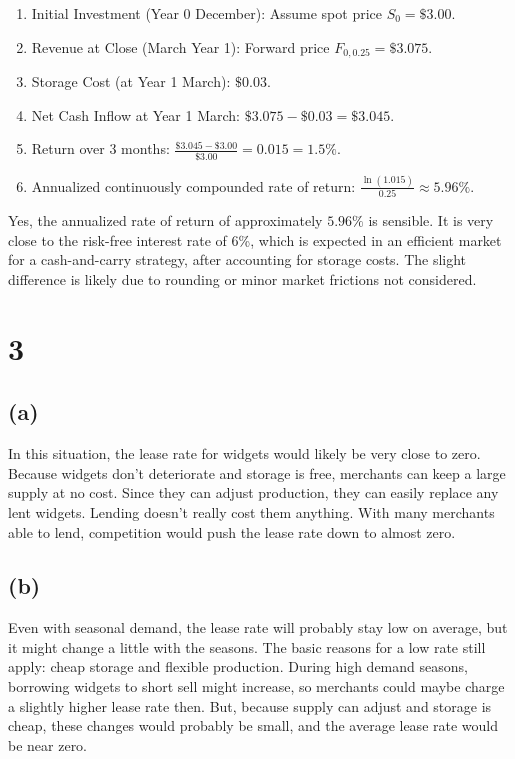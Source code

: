 \begin{enumerate}
\def\labelenumi{\arabic{enumi}.}
\tightlist
\item
  Initial Investment (Year 0 December): Assume spot price
  \(S_0 = \$3.00\).
\item
  Revenue at Close (March Year 1): Forward price
  \(F_{0,0.25} = \$3.075\).
\item
  Storage Cost (at Year 1 March): \(\$0.03\).
\item
  Net Cash Inflow at Year 1 March: \(\$3.075 - \$0.03 = \$3.045\).
\item
  Return over 3 months:
  \(\frac{\$3.045 - \$3.00}{\$3.00} = 0.015 = 1.5\%\).
\item
  Annualized continuously compounded rate of return:
  \(\frac{\ln(1.015)}{0.25} \approx 5.96\%\).
\end{enumerate}

Yes, the annualized rate of return of approximately \(\boxed{5.96\%}\)
is sensible. It is very close to the risk-free interest rate of 6\%,
which is expected in an efficient market for a cash-and-carry strategy,
after accounting for storage costs. The slight difference is likely due
to rounding or minor market frictions not considered.

    \section{3}\label{section}

\subsection{(a)}\label{a}

In this situation, the lease rate for widgets would likely be very close
to zero. Because widgets don't deteriorate and storage is free,
merchants can keep a large supply at no cost. Since they can adjust
production, they can easily replace any lent widgets. Lending doesn't
really cost them anything. With many merchants able to lend, competition
would push the lease rate down to almost zero.

\subsection{(b)}\label{b}

Even with seasonal demand, the lease rate will probably stay low on
average, but it might change a little with the seasons. The basic
reasons for a low rate still apply: cheap storage and flexible
production. During high demand seasons, borrowing widgets to short sell
might increase, so merchants could maybe charge a slightly higher lease
rate then. But, because supply can adjust and storage is cheap, these
changes would probably be small, and the average lease rate would be
near zero.

